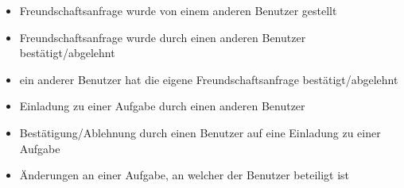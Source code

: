\begin{itemize}
\setlength{\itemsep}{0pt}%
\setlength{\parskip}{0pt}%
\item Freundschaftsanfrage wurde von einem anderen Benutzer gestellt
\item Freundschaftsanfrage wurde durch einen anderen Benutzer bestätigt/abgelehnt
\item ein anderer Benutzer hat die eigene Freundschaftsanfrage bestätigt/abgelehnt
\item Einladung zu einer Aufgabe durch einen anderen Benutzer
\item Bestätigung/Ablehnung durch einen Benutzer auf eine Einladung zu einer Aufgabe
\item Änderungen an einer Aufgabe, an welcher der Benutzer beteiligt ist
\end{itemize}
